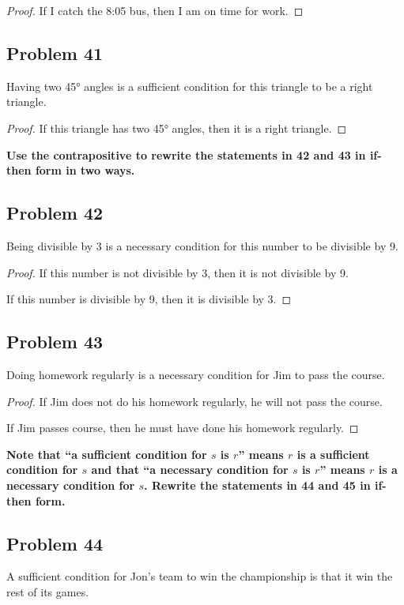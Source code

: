 \documentclass[14pt]{extarticle}
\begin{document}
\begin{proof}
If I catch the 8:05 bus, then I am on time for work.
\end{proof}

\subsection{Problem 41}
Having two 45° angles is a sufficient condition for this triangle to be a right
triangle.

\begin{proof}
If this triangle has two 45° angles, then it is a right triangle.
\end{proof}

{\bf Use the contrapositive to rewrite the statements in 42 and 43 in if-then
form in two ways.}

\subsection{Problem 42}
Being divisible by 3 is a necessary condition for this number to be divisible by
9.

\begin{proof}
If this number is not divisible by 3, then it is not
divisible by 9.

If this number is divisible by 9, then it is divisible by 3.
\end{proof}

\subsection{Problem 43}
Doing homework regularly is a necessary condition for Jim to pass the course.

\begin{proof}
If Jim does not do his homework regularly, he will not pass the course.

If Jim passes course, then he must have done his homework regularly.
\end{proof}

{\bf Note that “a sufficient condition for $s$ is $r$” means $r$
is a sufficient condition for $s$ and that “a necessary condition for $s$ is
$r$” means $r$ is a necessary condition for $s$. Rewrite the statements in 44
and 45 in if-then form.}

\subsection{Problem 44}
A sufficient condition for Jon’s team to win the championship is that it win the
rest of its games.
\end{document}
